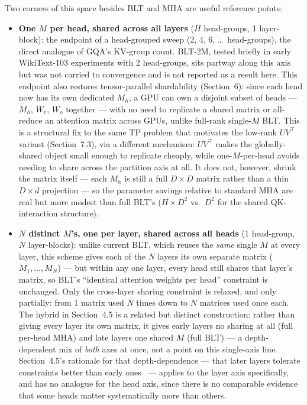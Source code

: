 \documentclass[11pt]{article}
\begin{document}
Two corners of this space besides BLT and MHA are useful reference points:

\begin{itemize}
\item \textbf{One $M$ per head, shared across all layers} ($H$ head-groups, 1 layer-block): the endpoint of a head-grouped sweep (2, 4, 6, \ldots\ head-groups), the direct analogue of GQA's KV-group count. BLT-2M, tested briefly in early WikiText-103 experiments with 2 head-groups, sits partway along this axis but was not carried to convergence and is not reported as a result here. This endpoint also restores tensor-parallel shardability (Section~6): since each head now has its own dedicated $M_h$, a GPU can own a disjoint subset of heads --- $M_h$, $W_v$, $W_o$ together --- with no need to replicate a shared matrix or all-reduce an attention matrix across GPUs, unlike full-rank single-$M$ BLT. This is a structural fix to the same TP problem that motivates the low-rank $UV^\top$ variant (Section~7.3), via a different mechanism: $UV^\top$ makes the globally-shared object small enough to replicate cheaply, while one-$M$-per-head avoids needing to share across the partition axis at all. It does not, however, shrink the matrix itself --- each $M_h$ is still a full $D\times D$ matrix rather than a thin $D\times d$ projection --- so the parameter savings relative to standard MHA are real but more modest than full BLT's ($H\times D^2$ vs.\ $D^2$ for the shared QK-interaction structure).
\item \textbf{$N$ distinct $M$'s, one per layer, shared across all heads} (1 head-group, $N$ layer-blocks): unlike current BLT, which reuses the \emph{same} single $M$ at every layer, this scheme gives each of the $N$ layers its own separate matrix ($M_1, \ldots, M_N$) --- but within any one layer, every head still shares that layer's matrix, so BLT's ``identical attention weights per head'' constraint is unchanged. Only the cross-layer sharing constraint is relaxed, and only partially: from 1 matrix used $N$ times down to $N$ matrices used once each. The hybrid in Section~4.5 is a related but distinct construction: rather than giving every layer its own matrix, it gives early layers no sharing at all (full per-head MHA) and late layers one shared $M$ (full BLT) --- a depth-dependent mix of \emph{both} axes at once, not a point on this single-axis line. Section~4.5's rationale for that depth-dependence --- that later layers tolerate constraints better than early ones~\cite{gromov2024} --- applies to the layer axis specifically, and has no analogue for the head axis, since there is no comparable evidence that some heads matter systematically more than others.
\end{itemize}
\end{document}
